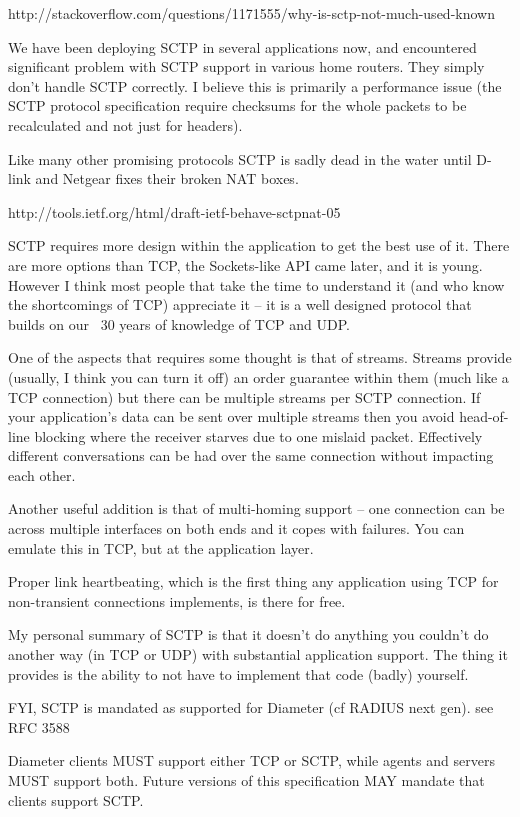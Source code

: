 \documentclass[twoside]{article}
\begin{document}
http://stackoverflow.com/questions/1171555/why-is-sctp-not-much-used-known

We have been deploying SCTP in several applications now, and encountered
significant problem with SCTP support in various home routers. They simply
don't handle SCTP correctly. I believe this is primarily a performance
issue (the SCTP protocol specification require checksums for the whole
packets to be recalculated and not just for headers).

Like many other promising protocols SCTP is sadly dead in the water
until D-link and Netgear fixes their broken NAT boxes.

http://tools.ietf.org/html/draft-ietf-behave-sctpnat-05



SCTP requires more design within the application to get the best use of
it. There are more options than TCP, the Sockets-like API came later,
and it is young. However I think most people that take the time to
understand it (and who know the shortcomings of TCP) appreciate it --
it is a well designed protocol that builds on our ~30 years of knowledge
of TCP and UDP.

One of the aspects that requires some thought is that of streams. Streams
provide (usually, I think you can turn it off) an order guarantee within
them (much like a TCP connection) but there can be multiple streams per
SCTP connection. If your application's data can be sent over multiple
streams then you avoid head-of-line blocking where the receiver starves
due to one mislaid packet. Effectively different conversations can be
had over the same connection without impacting each other.

Another useful addition is that of multi-homing support -- one connection
can be across multiple interfaces on both ends and it copes with
failures. You can emulate this in TCP, but at the application layer.

Proper link heartbeating, which is the first thing any application using
TCP for non-transient connections implements, is there for free.

My personal summary of SCTP is that it doesn't do anything you couldn't
do another way (in TCP or UDP) with substantial application support. The
thing it provides is the ability to not have to implement that code
(badly) yourself.

FYI, SCTP is mandated as supported for Diameter (cf RADIUS next gen). see
RFC 3588

     Diameter clients MUST support either TCP or SCTP, while agents and
     servers MUST support both.  Future versions of this specification
     MAY mandate that clients support SCTP.
\end{document}
